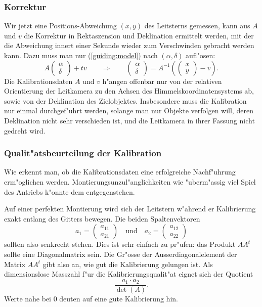 \subsubsection{Korrektur}
Wir jetzt eine Positions-Abweichung $(x,y)$ des Leitsterns gemessen,
kann aus $A$ und $v$ die Korrektur in Rektaszension und Deklination
ermittelt werden, mit der die Abweichung innert einer Sekunde wieder
zum Verschwinden gebracht werden kann. Dazu muss man nur
(\ref{guiding:model}) nach $(\alpha,\delta)$ aufl"osen:
\[
A\begin{pmatrix}\alpha\\\delta\end{pmatrix}+tv
\qquad
\Rightarrow
\qquad
\begin{pmatrix}\alpha\\\delta\end{pmatrix}=
A^{-1}\left(
\begin{pmatrix}
x\\y
\end{pmatrix}
-v
\right).
\]
Die Kalibrationsdaten $A$ und $v$ h"angen offenbar nur von der relativen
Orientierung der Leitkamera zu den Achsen des Himmelskoordinatensystems
ab, sowie von der Deklination des Zielobjektes.
Insbesondere muss die
Kalibration nur einmal durchgef"uhrt werden, solange man nur Objekte verfolgen
will, deren Deklination nicht sehr verschieden ist, und die Leitkamera in ihrer
Fassung nicht gedreht wird.

\subsubsection{Qualit"atsbeurteilung der Kalibration}
Wie erkennt man, ob die Kalibrationsdaten eine erfolgreiche Nachf"uhrung
erm"oglichen werden. Montierungsunzul"anglichkeiten wie "uberm"assig 
viel Spiel des Antriebs k"onnte dem entgegenstehen.

Auf einer perfekten Montierung wird sich der Leitstern w"ahrend er 
Kalibrierung exakt entlang des Gitters bewegen. Die beiden Spaltenvektoren
\[
a_1=\begin{pmatrix}a_{11}\\ a_{21}\end{pmatrix}
\quad\text{und}
\quad
a_2=\begin{pmatrix}a_{12}\\ a_{22}\end{pmatrix}
\]
sollten also senkrecht stehen. Dies ist sehr einfach zu pr"ufen:
das Produkt $AA^t$ sollte eine Diagonalmatrix sein. Die Gr"osse der
Ausserdiagonalelement der Matrix $AA^t$ gibt also an, wie gut die Kalibrierung
gelungen ist.
Als dimensionslose  Masszahl f"ur die Kalibrierungsqualit"at
eignet sich der Quotient
\[
\frac{a_1\cdot a_2}{\det(A)}.
\]
Werte nahe bei $0$ deuten auf eine gute Kalibrierung hin.
